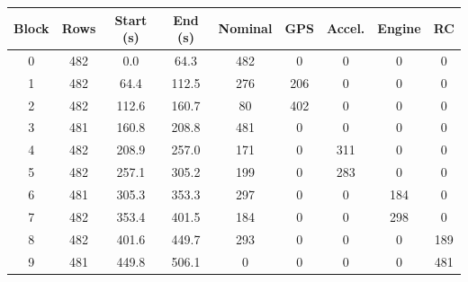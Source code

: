 \begin{tabular}{ccccccccc}
\toprule
Block & Rows & Start (s) & End (s) & Nominal & GPS & Accel. & Engine & RC \\
\midrule
0 & 482 & 0.0 & 64.3 & 482 & 0 & 0 & 0 & 0 \\
1 & 482 & 64.4 & 112.5 & 276 & 206 & 0 & 0 & 0 \\
2 & 482 & 112.6 & 160.7 & 80 & 402 & 0 & 0 & 0 \\
3 & 481 & 160.8 & 208.8 & 481 & 0 & 0 & 0 & 0 \\
4 & 482 & 208.9 & 257.0 & 171 & 0 & 311 & 0 & 0 \\
5 & 482 & 257.1 & 305.2 & 199 & 0 & 283 & 0 & 0 \\
6 & 481 & 305.3 & 353.3 & 297 & 0 & 0 & 184 & 0 \\
7 & 482 & 353.4 & 401.5 & 184 & 0 & 0 & 298 & 0 \\
8 & 482 & 401.6 & 449.7 & 293 & 0 & 0 & 0 & 189 \\
9 & 481 & 449.8 & 506.1 & 0 & 0 & 0 & 0 & 481 \\
\bottomrule
\end{tabular}
